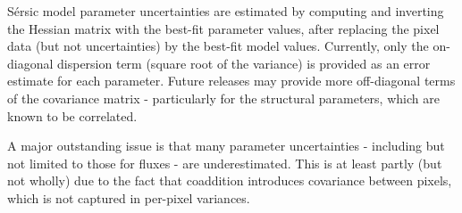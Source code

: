 S\'ersic model parameter uncertainties are estimated by computing and inverting the Hessian matrix with the best-fit parameter values, after replacing the pixel data (but not uncertainties) by the best-fit model values.
Currently, only the on-diagonal dispersion term (square root of the variance) is provided as an error estimate for each parameter.
Future releases may provide more off-diagonal terms of the covariance matrix - particularly for the structural parameters, which are known to be correlated.

A major outstanding issue is that many parameter uncertainties - including but not limited to those for fluxes - are underestimated.
This is at least partly (but not wholly) due to the fact that coaddition introduces covariance between pixels, which is not captured in per-pixel variances.

